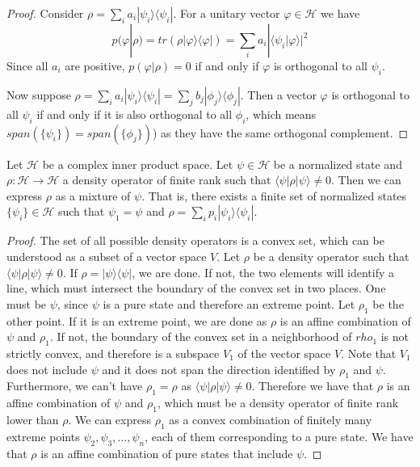 \documentclass[10pt,twocolumn, nofootinbib]{revtex4-2}
\def\>{\rangle}
\def\<{\langle}
\begin{document}
\begin{proof}
	Consider $\rho = \sum_i a_i |\psi_i\>\<\psi_i|$. For a unitary vector $\varphi \in \mathcal{H}$ we have
	$$p(\varphi|\rho)=tr(\rho |\varphi\>\<\varphi|) =  \sum_i a_i |\<\psi_i|\varphi\>|^2$$
	Since all $a_i$ are positive, $p(\varphi|\rho) = 0$ if and only if $\varphi$ is orthogonal to all $\psi_i$.
	
	Now suppose $\rho = \sum_i a_i |\psi_i\>\<\psi_i| = \sum_j b_j |\phi_j\>\<\phi_j|$. Then a vector $\varphi$ is orthogonal to all $\psi_i$ if and only if it is also orthogonal to all $\phi_i$, which means $span(\{\psi_i\}) = span(\{\phi_j\})$) as they have the same orthogonal complement.
\end{proof}

\begin{prop}\label{prop_decomposition}
	Let $\mathcal{H}$ be a complex inner product space. Let $\psi \in \mathcal{H}$ be a normalized state and $\rho : \mathcal{H} \to \mathcal{H}$ a density operator of finite rank such that $\<\psi|\rho|\psi\>\neq 0$. Then we can express $\rho$ as a mixture of $\psi$. That is, there exists a finite set of normalized states $\{\psi_i\} \in \mathcal{H}$ such that $\psi_1 = \psi$ and $\rho = \sum_i p_i |\psi_i\>\<\psi_i|$.
\end{prop}

\begin{proof}
	The set of all possible density operators is a convex set, which can be understood as a subset of a vector space $V$. Let $\rho$ be a density operator such that $\<\psi|\rho|\psi\>\neq 0$. If $\rho = |\psi\>\<\psi|$, we are done. If not, the two elements will identify a line, which must intersect the boundary of the convex set in two places. One must be $\psi$, since $\psi$ is a pure state and therefore an extreme point. Let $\rho_1$ be the other point. If it is an extreme point, we are done as $\rho$ is an affine combination of $\psi$ and $\rho_1$. If not, the boundary of the convex set in a neighborhood of $rho_1$ is not strictly convex, and therefore is a subspace $V_1$ of the vector space $V$. Note that $V_1$ does not include $\psi$ and it does not span the direction identified by $\rho_1$ and $\psi$. Furthermore, we can't have $\rho_1 = \rho$ as $\<\psi|\rho|\psi\>\neq 0$. Therefore we have that $\rho$ is an affine combination of $\psi$ and $\rho_1$, which must be a density operator of finite rank lower than $\rho$. We can express $\rho_1$ as a convex combination of finitely many extreme points $\psi_2, \psi_3, ..., \psi_n$, each of them corresponding to a pure state. We have that $\rho$ is an affine combination of pure states that include $\psi$.
\end{proof}
\end{document}

